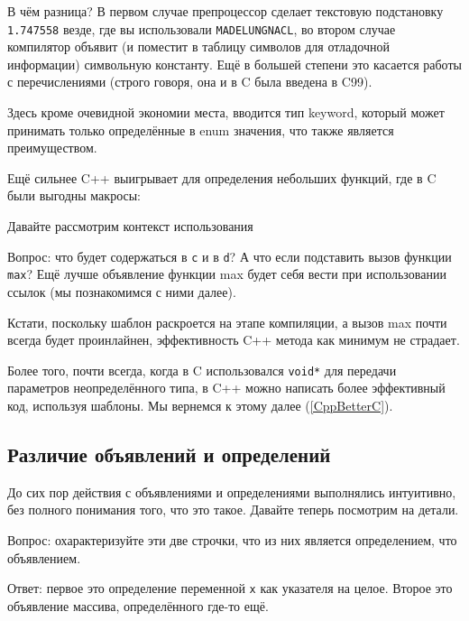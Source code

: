 \documentclass[a4paper,12pt,oneside]{article}
\begin{document}
В чём разница? В первом случае препроцессор сделает текстовую подстановку \lstinline!1.747558! везде, где вы использовали \lstinline!MADELUNGNACL!, во втором случае компилятор объявит (и поместит в таблицу символов для отладочной информации) символьную константу. Ещё в большей степени это касается работы с перечислениями (строго говоря, она и в C была введена в C99).



Здесь кроме очевидной экономии места, вводится тип keyword, который может принимать только определённые в enum значения, что также является преимуществом.

Ещё сильнее C++ выигрывает для определения небольших функций, где в C были выгодны макросы:



Давайте рассмотрим контекст использования



Вопрос: что будет содержаться в \lstinline!c! и в \lstinline!d!? А что если подставить вызов функции \lstinline!max!? Ещё лучше объявление функции max будет себя вести при использовании ссылок (мы познакомимся с ними далее).

Кстати, поскольку шаблон раскроется на этапе компиляции, а вызов max почти всегда будет проинлайнен, эффективность C++ метода как минимум не страдает.

Более того, почти всегда, когда в C использовался \lstinline!void*! для передачи параметров неопределённого типа, в C++ можно написать более эффективный код, используя шаблоны. Мы вернемся к этому далее (\ref{CppBetterC}).

\subsection{Различие объявлений и определений}

До сих пор действия с объявлениями и определениями выполнялись интуитивно, без полного понимания того, что это такое. Давайте теперь посмотрим на детали.

Вопрос: охарактеризуйте эти две строчки, что из них является определением, что объявлением.



Ответ: первое это определение переменной \lstinline!x! как указателя на целое. Второе это объявление массива, определённого где-то ещё.
\end{document}
